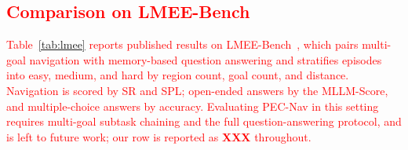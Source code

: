 
\subsection{\textcolor{red}{Comparison on LMEE-Bench}}

\textcolor{red}{Table~\ref{tab:lmee} reports published results on LMEE-Bench~\cite{wang2026memoryexplorer}, which pairs multi-goal navigation with memory-based question answering and stratifies episodes into easy, medium, and hard by region count, goal count, and distance. Navigation is scored by SR and SPL; open-ended answers by the MLLM-Score, and multiple-choice answers by accuracy. Evaluating PEC-Nav in this setting requires multi-goal subtask chaining and the full question-answering protocol, and is left to future work; our row is reported as \textbf{XXX} throughout.}

